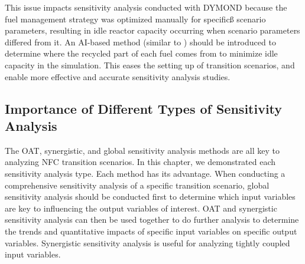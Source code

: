 This issue impacts sensitivity analysis conducted 
with DYMOND because the fuel management strategy was 
optimized manually for specificß scenario parameters, resulting in 
idle reactor capacity occurring when scenario parameters differed 
from it. 
An AI-based method (similar to \deploy) 
should be introduced to 
determine where the recycled part of each fuel comes from to 
minimize idle capacity in the simulation. 
This eases the setting up of transition scenarios, and enable 
more effective and accurate sensitivity analysis studies.

\subsection{Importance of Different Types of Sensitivity Analysis}
The OAT, synergistic, and global sensitivity analysis methods 
are all key to analyzing \gls{NFC} transition scenarios. 
In this chapter, we demonstrated each sensitivity analysis type. 
Each method has its advantage. 
When conducting a comprehensive sensitivity analysis of a specific 
transition scenario, 
global sensitivity analysis should be conducted first to 
determine which input variables are key to influencing the output 
variables of interest. 
OAT and synergistic sensitivity analysis can then be used together to 
do further analysis to determine the trends and quantitative impacts 
of specific input variables on specific output variables. 
Synergistic sensitivity analysis is useful for analyzing 
tightly coupled input variables.  
